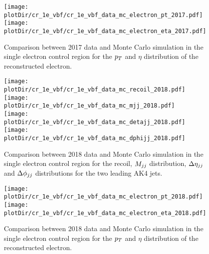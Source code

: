 \begin{figure}[htbp]
    \begin{center}
        \texttt{[image: \\plotDir/cr\_1e\_vbf/cr\_1e\_vbf\_data\_mc\_electron\_pt\_2017.pdf]}
        \texttt{[image: \\plotDir/cr\_1e\_vbf/cr\_1e\_vbf\_data\_mc\_electron\_eta\_2017.pdf]}
    \end{center}
    \caption{Comparison between 2017 data and Monte Carlo simulation in the single electron control region for 
    the $p_T$ and $\eta$ distribution of the reconstructed electron.}
    \label{fig:cr_1e_vbf_2017_mtr_2}
\end{figure}

\begin{figure}[htbp]
    \begin{center}
        \texttt{[image: \\plotDir/cr\_1e\_vbf/cr\_1e\_vbf\_data\_mc\_recoil\_2018.pdf]}
        \texttt{[image: \\plotDir/cr\_1e\_vbf/cr\_1e\_vbf\_data\_mc\_mjj\_2018.pdf]} \\
        \texttt{[image: \\plotDir/cr\_1e\_vbf/cr\_1e\_vbf\_data\_mc\_detajj\_2018.pdf]}
        \texttt{[image: \\plotDir/cr\_1e\_vbf/cr\_1e\_vbf\_data\_mc\_dphijj\_2018.pdf]}
    \end{center}
    \caption{Comparison between 2018 data and Monte Carlo simulation in the single electron control region for
        the recoil, $M_{jj}$ distribution, $\Delta \eta_{jj}$ and $\Delta \phi_{jj}$ distributions for the two leading AK4 jets.}
    \label{fig:cr_1e_vbf_2018_mtr}
\end{figure}

\begin{figure}[htbp]
    \begin{center}
        \texttt{[image: \\plotDir/cr\_1e\_vbf/cr\_1e\_vbf\_data\_mc\_electron\_pt\_2018.pdf]}
        \texttt{[image: \\plotDir/cr\_1e\_vbf/cr\_1e\_vbf\_data\_mc\_electron\_eta\_2018.pdf]}
    \end{center}
    \caption{Comparison between 2018 data and Monte Carlo simulation in the single electron control region for 
    the $p_T$ and $\eta$ distribution of the reconstructed electron.}
    \label{fig:cr_1e_vbf_2018_mtr_2}
\end{figure}

